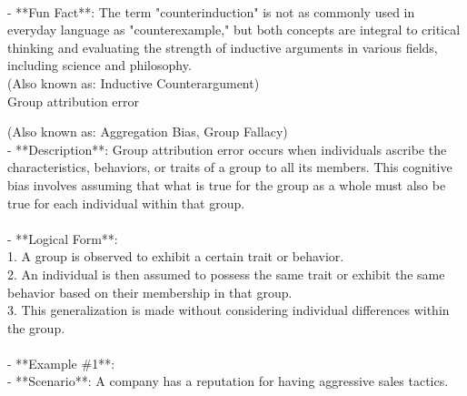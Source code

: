 \documentclass[a4paper,12pt,single,pdftex]{scrbook}
\begin{document}
    
      
    \\

    
      - **Fun Fact**: The term "counterinduction" is not as commonly used in everyday language as "counterexample," but both concepts are integral to critical thinking and evaluating the strength of inductive arguments in various fields, including science and philosophy.
    \\

  
    
      (Also known as: Inductive Counterargument)
    \\

  

Group attribution error
    
      (Also known as: Aggregation Bias, Group Fallacy)
    \\

  
    
      - **Description**: Group attribution error occurs when individuals ascribe the characteristics, behaviors, or traits of a group to all its members. This cognitive bias involves assuming that what is true for the group as a whole must also be true for each individual within that group.
    \\

    
      
    \\

    
      - **Logical Form**:
    \\

    
        1. A group is observed to exhibit a certain trait or behavior.
    \\

    
        2. An individual is then assumed to possess the same trait or exhibit the same behavior based on their membership in that group.
    \\

    
        3. This generalization is made without considering individual differences within the group.
    \\

    
      
    \\

    
      - **Example \#1**:
    \\

    
        - **Scenario**: A company has a reputation for having aggressive sales tactics.
    \\
\end{document}

